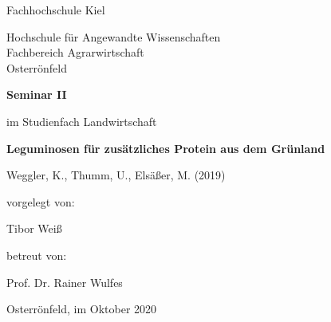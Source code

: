 
\begin{titlepage}
\centering

\begingroup
    \Large{Fachhochschule Kiel}
    \par
\endgroup

\begingroup
    \large{Hochschule für Angewandte Wissenschaften \\
        Fachbereich Agrarwirtschaft \\
        Osterrönfeld}
    \par
\endgroup


\vspace{3cm}


\begingroup
    \Large
    \bfseries{Seminar II}
    \par
\endgroup

\vspace{0.1cm}

im Studienfach Landwirtschaft

\vspace{2cm}

\hrulefill

\vspace{0.5cm}
\begingroup
    \LARGE
    \bfseries{Leguminosen für zusätzliches Protein aus dem Grünland}
    \par
\endgroup
\vspace{0.5cm}
\begingroup
    \small
    Weggler, K., Thumm, U., Elsäßer, M. (2019)
    \par
\endgroup
\vspace{0.2cm}
\hrulefill
\vspace{2cm}

vorgelegt von:

\begingroup
    \large{Tibor Weiß}
    \par
\endgroup

\vspace{2cm}

betreut von:

\begingroup
    \large{Prof. Dr. Rainer Wulfes}
    \par
\endgroup

\vspace{1cm}

Osterrönfeld, im Oktober 2020

\end{titlepage}
